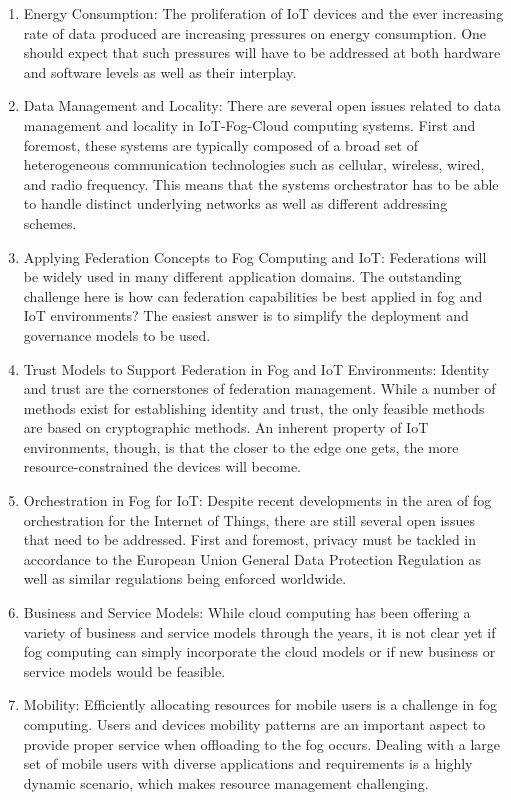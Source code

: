 \begin{enumerate}
    \item Energy Consumption: The proliferation of IoT devices and the ever increasing rate of data produced are increasing pressures on energy consumption. One should expect that such pressures will have to be addressed at both hardware and software levels as well as their interplay.
    \item Data Management and Locality: There are several open issues related to data management and locality in IoT-Fog-Cloud computing systems. First and foremost, these systems are typically composed of a broad set of heterogeneous communication technologies such as cellular, wireless, wired, and radio frequency. This means that the systems orchestrator has to be able to handle distinct underlying networks as well as different addressing schemes.
    \item Applying Federation Concepts to Fog Computing and IoT: Federations will be widely used in many different application domains. The outstanding challenge here is how can federation capabilities be best applied in fog and IoT environments? The easiest answer is to simplify the deployment and governance models to be used.
    \item Trust Models to Support Federation in Fog and IoT Environments: Identity and trust are the cornerstones of federation management. While a number of methods exist for establishing identity and trust, the only feasible methods are based on cryptographic methods. An inherent property of IoT environments, though, is that the closer to the edge one gets, the more resource-constrained the devices will become.
    \item Orchestration in Fog for IoT: Despite recent developments in the area of fog orchestration for the Internet of Things, there are still several open issues that need to be addressed. First and foremost, privacy must be tackled in accordance to the European Union General Data Protection Regulation as well as similar regulations being enforced worldwide.
    \item Business and Service Models: While cloud computing has been offering a variety of business and service models through the years, it is not clear yet if fog computing can simply incorporate the cloud models or if new business or service models would be feasible.
    \item Mobility: Efficiently allocating resources for mobile users is a challenge in fog computing. Users and devices mobility patterns are an important aspect to provide proper service when offloading to the fog occurs. Dealing with a large set of mobile users with diverse applications and requirements is a highly dynamic scenario, which makes resource management challenging.

\end{enumerate}
